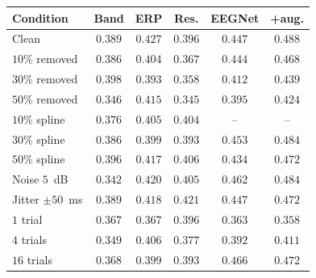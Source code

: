 \begin{tabular}{lccccc}
\toprule
Condition & Band & ERP & Res. & EEGNet & +aug. \\
\midrule
Clean & $0.389$ & $0.427$ & $0.396$ & $0.447$ & $0.488$ \\
\midrule
$10\%$ removed & $0.386$ & $0.404$ & $0.367$ & $0.444$ & $0.468$ \\
$30\%$ removed & $0.398$ & $0.393$ & $0.358$ & $0.412$ & $0.439$ \\
$50\%$ removed & $0.346$ & $0.415$ & $0.345$ & $0.395$ & $0.424$ \\
\midrule
$10\%$ spline & $0.376$ & $0.405$ & $0.404$ & -- & -- \\
$30\%$ spline & $0.386$ & $0.399$ & $0.393$ & $0.453$ & $0.484$ \\
$50\%$ spline & $0.396$ & $0.417$ & $0.406$ & $0.434$ & $0.472$ \\
\midrule
Noise $5$~dB & $0.342$ & $0.420$ & $0.405$ & $0.462$ & $0.484$ \\
Jitter $\pm50$~ms & $0.389$ & $0.418$ & $0.421$ & $0.447$ & $0.472$ \\
\midrule
$1$ trial & $0.367$ & $0.367$ & $0.396$ & $0.363$ & $0.358$ \\
$4$ trials & $0.349$ & $0.406$ & $0.377$ & $0.392$ & $0.411$ \\
$16$ trials & $0.368$ & $0.399$ & $0.393$ & $0.466$ & $0.472$ \\
\bottomrule
\end{tabular}
